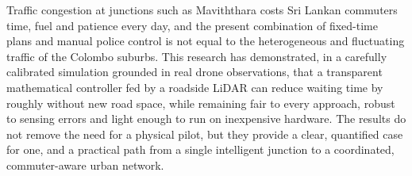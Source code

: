 Traffic congestion at junctions such as Maviththara costs Sri Lankan commuters time, fuel and patience every day, and the present combination of fixed-time plans and manual police control is not equal to the heterogeneous and fluctuating traffic of the Colombo suburbs. This research has demonstrated, in a carefully calibrated simulation grounded in real drone observations, that a transparent mathematical controller fed by a roadside LiDAR can reduce waiting time by roughly  without new road space, while remaining fair to every approach, robust to sensing errors and light enough to run on inexpensive hardware. The results do not remove the need for a physical pilot, but they provide a clear, quantified case for one, and a practical path from a single intelligent junction to a coordinated, commuter-aware urban network.
